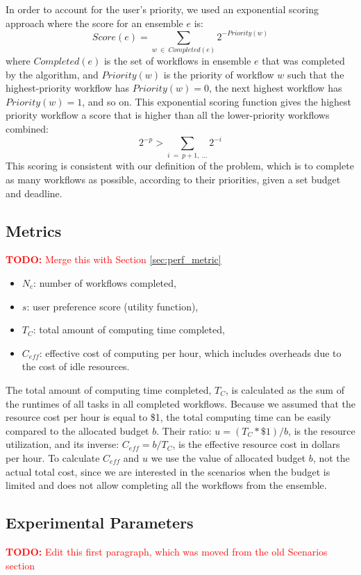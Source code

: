 \documentclass[conference]{IEEEtran}
\newcommand{\TODO}[1]{
  {\Large \textcolor{red}{\textbf{TODO: }#1}}
}
\begin{document}
In order to account for the user's priority, we used an exponential scoring approach where the score for an ensemble $e$ is:
%
$$
Score(e) = \sum_{w~\in~Completed(e)}{2^{-Priority(w)}}
$$
%
where $Completed(e)$ is the set of workflows in ensemble $e$ that was completed by the algorithm, and $Priority(w)$ is the priority of workflow $w$ such that the highest-priority workflow has $Priority(w)=0$, the next highest workflow has $Priority(w)=1$, and so on. This exponential scoring function gives the highest priority workflow a score that is higher than all the lower-priority workflows combined:
%
$$
2^{-p} > \sum_{i~=~p+1,~\ldots}2^{-i}
$$
%
This scoring is consistent with our definition of the problem, which is to complete as many workflows as possible, according to their priorities, given a set budget and deadline.


\subsection{Metrics}

\TODO{Merge this with Section \ref{sec:perf_metric}}

\begin{itemize}
  \item $N_c$: number of workflows completed,
  \item $s$: user preference score (utility function),
  \item $T_C$: total amount of computing time completed,
  \item $C_{eff}$: effective cost of computing per hour, which includes
  overheads due to the cost of idle resources.
\end{itemize}

The total amount of computing time completed, $T_C$, is calculated as the sum 
of the runtimes of all tasks in all completed workflows. Because we assumed 
that the resource cost per hour is equal to \$1, the total computing time 
can be easily compared to the allocated budget $b$. Their ratio: 
$u = (T_C * \$1)/b$, is the resource utilization, and its inverse: 
$C_{eff} = b/T_C$, is the effective resource cost in dollars per hour. To
calculate $C_{eff}$ and $u$ we use the value of allocated budget $b$, not the
actual total cost, since we are interested in the scenarios when the budget is
limited and does not allow completing all the workflows from the ensemble.


\subsection{Experimental Parameters}
\label{sec:exp-parameters}
\TODO{Edit this first paragraph, which was moved from the old Scenarios section}
\end{document}
